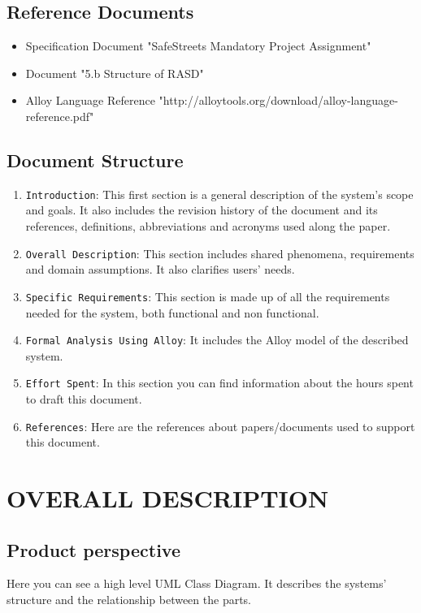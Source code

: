 \documentclass[12pt,a4paper]{article}
\begin{document}
\subsection{Reference Documents} 
\begin{itemize}
				\item Specification Document "SafeStreets Mandatory Project Assignment"
				\item Document "5.b Structure of RASD"
				\item Alloy Language Reference "http://alloytools.org/download/alloy-language-reference.pdf"
			\end{itemize}
\subsection{Document Structure} 
		\begin{enumerate}
			\item \texttt{Introduction}: This first section is a general description of the system's scope and goals. It also includes the revision history of the document and its references, definitions, abbreviations and acronyms used along the paper.
			\item \texttt{Overall Description}: This section includes shared phenomena, requirements and domain assumptions. It also clarifies users' needs.
			\item \texttt{Specific Requirements}: This section is made up of all the requirements needed for the system, both functional and non functional.
			\item \texttt{Formal Analysis Using Alloy}: It includes the Alloy model of the described system.
			\item \texttt{Effort Spent}: In this section you can find information about the hours spent to draft this document.
			\item \texttt{References}: Here are the references about papers/documents used to support this document.
		\end{enumerate}

\newpage
\section{OVERALL DESCRIPTION}
\subsection{Product perspective}
Here you can see a high level UML Class Diagram. It describes the systems' structure and the relationship between the parts.
\end{document}
